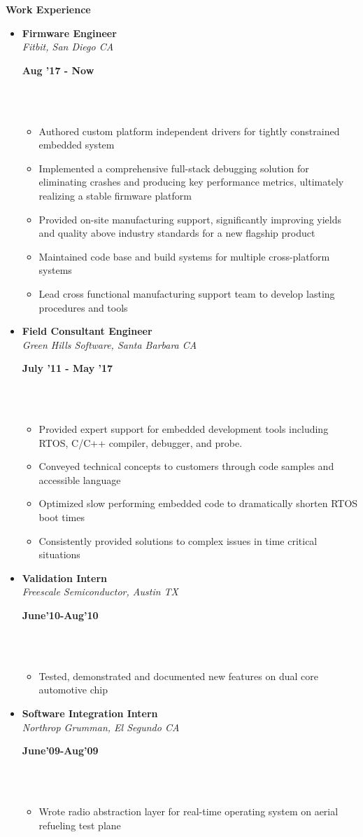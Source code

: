 \documentclass[a4paper,11pt]{article}
\newcommand{\isep}{0 pt}
\newcommand{\resheading}[1]{{\small \colorbox{mygrey}{\begin{minipage}{0.975\textwidth}{\textbf{#1 \vphantom{p\^{E}}}}\end{minipage}}}}
\newcommand{\workexp}[4]{
\begin{minipage}[t]{7cm}
\begin{flushleft}
\textbf{#1} \\
\indent \emph{#2}\\
\end{flushleft}
\end{minipage}
\hfill
\begin{minipage}[t]{7cm}
\begin{flushright}
\textbf{#3} \\
\indent #4 \\
\end{flushright}
\end{minipage}
\\[-0.10in]
}
\begin{document}
\resheading{\textbf{Work Experience}}
\begin{itemize}
\item
\workexp{Firmware Engineer}{Fitbit, San Diego CA}{Aug '17 - Now}{}
	\begin{itemize}\itemsep \isep
	    \item Authored custom platform independent  drivers for tightly constrained embedded system
	    \item Implemented a comprehensive full-stack debugging solution for eliminating crashes and producing key performance metrics, ultimately realizing a stable firmware platform
	    \item Provided on-site manufacturing support, significantly improving yields and quality above industry standards for a new flagship product
	    \item Maintained code base and build systems for multiple cross-platform systems
	   \item Lead cross functional manufacturing support team to develop lasting procedures and tools
    \end{itemize}

\item
\workexp{Field Consultant Engineer}{Green Hills Software, Santa Barbara CA}{July '11 - May '17}{}
	\begin{itemize}\itemsep \isep
	\item Provided expert support for embedded development tools including RTOS, C/C++ compiler, debugger, and probe.
	\item Conveyed technical concepts to customers through code samples and accessible language
	\item Optimized slow performing embedded code to dramatically shorten RTOS boot times
	\item Consistently provided solutions to complex issues in time critical situations
	\end{itemize}

\item
\workexp{Validation Intern}{Freescale Semiconductor, Austin TX}{June'10-Aug'10}{}
	\begin{itemize}\itemsep \isep
	\item Tested, demonstrated and documented new features on dual core automotive chip
	\end{itemize}
\item
\workexp{Software Integration Intern}{Northrop Grumman, El Segundo CA}{June'09-Aug'09}{}
	\begin{itemize}\itemsep \isep
	\item Wrote radio abstraction layer for real-time operating system on aerial refueling test plane
	\end{itemize}
\end{itemize}
\end{document}
